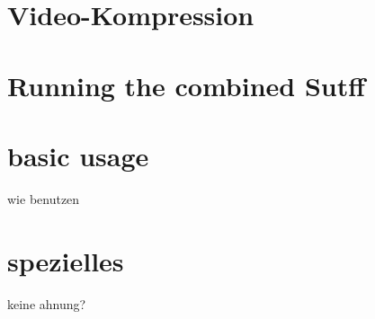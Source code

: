 \section{Video-Kompression}


\section{Running the combined Sutff}


\section{basic usage}
wie benutzen

\section{spezielles}
keine ahnung?

